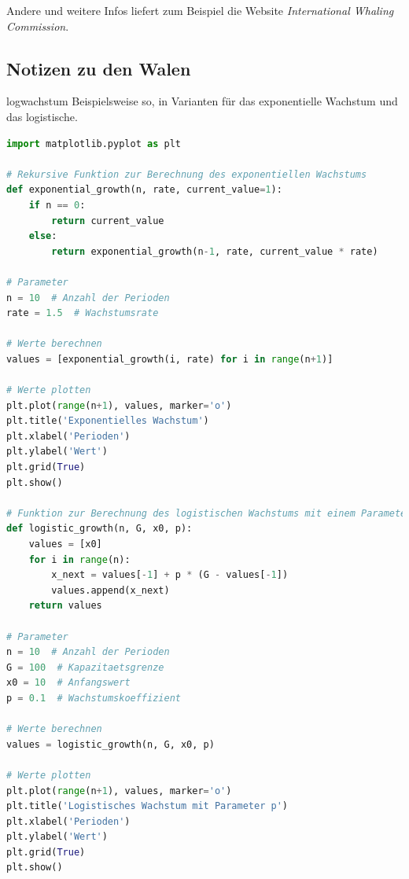 \documentclass[%
<<<<<<< Updated upstream
11pt,%
twoside,%
titlepage,%
german,%
headsepline%
]{scrartcl}
\begin{document}
Andere und weitere Infos liefert zum Beispiel die Website \emph{International Whaling Commission}.

\clearpage

\subsection{Notizen zu den Walen}

\begin{lsg}{logwachstum}
Beispielsweise so, in Varianten für das exponentielle Wachstum und das logistische.

\begin{lstlisting}[language=Python]
import matplotlib.pyplot as plt

# Rekursive Funktion zur Berechnung des exponentiellen Wachstums
def exponential_growth(n, rate, current_value=1):
    if n == 0:
        return current_value
    else:
        return exponential_growth(n-1, rate, current_value * rate)

# Parameter
n = 10  # Anzahl der Perioden
rate = 1.5  # Wachstumsrate

# Werte berechnen
values = [exponential_growth(i, rate) for i in range(n+1)]

# Werte plotten
plt.plot(range(n+1), values, marker='o')
plt.title('Exponentielles Wachstum')
plt.xlabel('Perioden')
plt.ylabel('Wert')
plt.grid(True)
plt.show()

# Funktion zur Berechnung des logistischen Wachstums mit einem Parameter p
def logistic_growth(n, G, x0, p):
    values = [x0]
    for i in range(n):
        x_next = values[-1] + p * (G - values[-1])
        values.append(x_next)
    return values

# Parameter
n = 10  # Anzahl der Perioden
G = 100  # Kapazitaetsgrenze
x0 = 10  # Anfangswert
p = 0.1  # Wachstumskoeffizient

# Werte berechnen
values = logistic_growth(n, G, x0, p)

# Werte plotten
plt.plot(range(n+1), values, marker='o')
plt.title('Logistisches Wachstum mit Parameter p')
plt.xlabel('Perioden')
plt.ylabel('Wert')
plt.grid(True)
plt.show()
\end{lstlisting}
\end{lsg}
\end{document}
